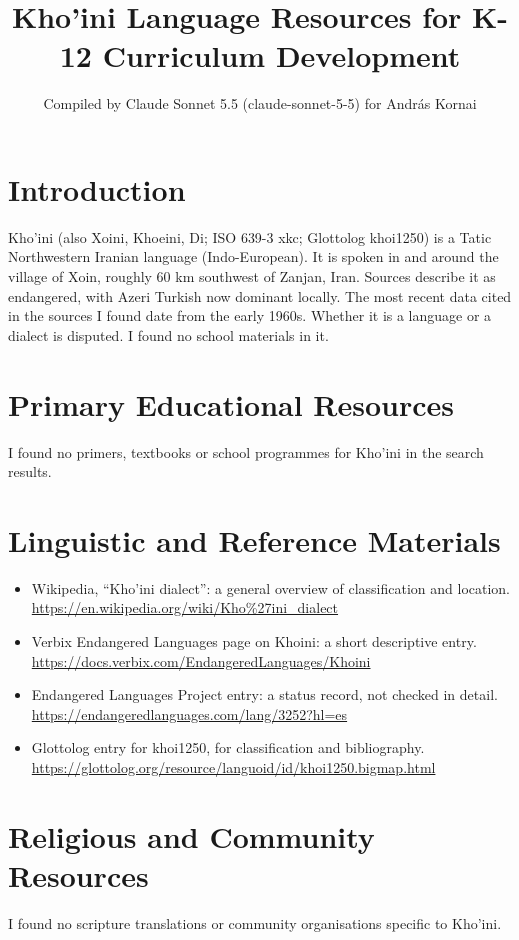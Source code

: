 \documentclass[12pt]{article}
\title{Kho'ini Language Resources for K-12 Curriculum Development}
\author{Compiled by Claude Sonnet 5.5 (claude-sonnet-5-5) for Andr\'as Kornai}
\date{}
\begin{document}
\maketitle

\section{Introduction}
Kho'ini (also Xoini, Khoeini, Di; ISO 639-3 xkc; Glottolog khoi1250) is a Tatic Northwestern Iranian language (Indo-European). It is spoken in and around the village of Xoin, roughly 60 km southwest of Zanjan, Iran. Sources describe it as endangered, with Azeri Turkish now dominant locally. The most recent data cited in the sources I found date from the early 1960s. Whether it is a language or a dialect is disputed. I found no school materials in it.

\section{Primary Educational Resources}
I found no primers, textbooks or school programmes for Kho'ini in the search results.

\section{Linguistic and Reference Materials}
\begin{itemize}
\item Wikipedia, ``Kho'ini dialect'': a general overview of classification and location. \url{https://en.wikipedia.org/wiki/Kho%27ini_dialect}
\item Verbix Endangered Languages page on Khoini: a short descriptive entry. \url{https://docs.verbix.com/EndangeredLanguages/Khoini}
\item Endangered Languages Project entry: a status record, not checked in detail. \url{https://endangeredlanguages.com/lang/3252?hl=es}
\item Glottolog entry for khoi1250, for classification and bibliography. \url{https://glottolog.org/resource/languoid/id/khoi1250.bigmap.html}
\end{itemize}

\section{Religious and Community Resources}
I found no scripture translations or community organisations specific to Kho'ini.
\end{document}
